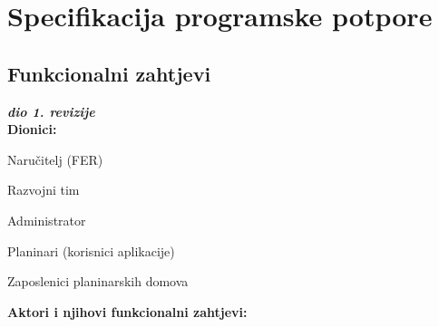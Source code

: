 \chapter{Specifikacija programske potpore}
		
	\section{Funkcionalni zahtjevi}
			
			\textbf{\textit{dio 1. revizije}}\\	
			
			\noindent \textbf{Dionici:}
			
			\begin{packed_enum}
				
				\item Naručitelj (FER)
				\item Razvojni tim
				\item Administrator				
				\item Planinari (korisnici aplikacije)
				\item Zaposlenici planinarskih domova
				
			\end{packed_enum}
			
			\noindent \textbf{Aktori i njihovi funkcionalni zahtjevi:}
			

